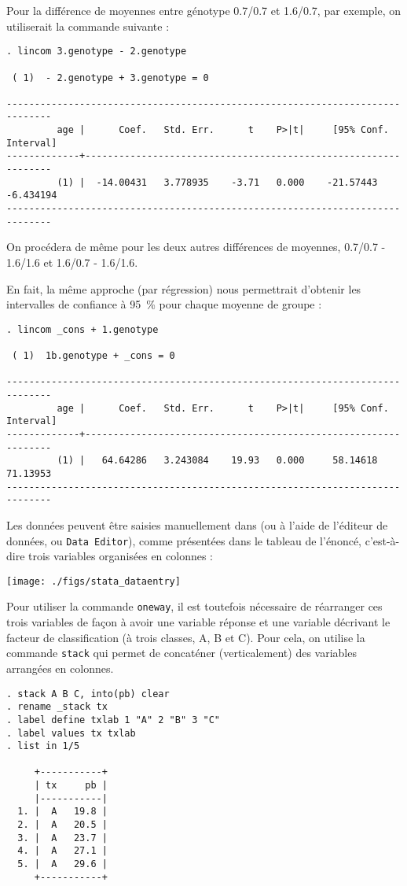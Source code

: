 Pour la différence de moyennes entre génotype 0.7/0.7 et 1.6/0.7, par
exemple, on utiliserait la commande suivante :
\begin{verbatim}
. lincom 3.genotype - 2.genotype

 ( 1)  - 2.genotype + 3.genotype = 0

------------------------------------------------------------------------------
         age |      Coef.   Std. Err.      t    P>|t|     [95% Conf. Interval]
-------------+----------------------------------------------------------------
         (1) |  -14.00431   3.778935    -3.71   0.000    -21.57443   -6.434194
------------------------------------------------------------------------------
\end{verbatim}
On procédera de même pour les deux autres différences de moyennes, 0.7/0.7 -
1.6/1.6 et 1.6/0.7 - 1.6/1.6.

En fait, la même approche (par régression) nous permettrait d'obtenir les
intervalles de confiance à 95~\% pour chaque moyenne de groupe :
\begin{verbatim}
. lincom _cons + 1.genotype

 ( 1)  1b.genotype + _cons = 0

------------------------------------------------------------------------------
         age |      Coef.   Std. Err.      t    P>|t|     [95% Conf. Interval]
-------------+----------------------------------------------------------------
         (1) |   64.64286   3.243084    19.93   0.000     58.14618    71.13953
------------------------------------------------------------------------------
\end{verbatim}

\soln{\ref{exo:9.6}}
Les données peuvent être saisies manuellement dans \Stata (ou à l'aide de
l'éditeur de données, ou \texttt{Data Editor}), comme présentées dans le
tableau de l'énoncé, c'est-à-dire trois variables organisées en colonnes :

\texttt{[image: ./figs/stata\_dataentry]}

Pour utiliser la commande \texttt{oneway}, il est toutefois nécessaire de
réarranger ces trois variables de façon à avoir une variable réponse et une
variable décrivant le facteur de classification (à trois classes, A, B et
C). Pour cela, on utilise la commande \texttt{stack} qui permet de
concaténer (verticalement) des variables arrangées en colonnes.
\begin{verbatim}
. stack A B C, into(pb) clear
. rename _stack tx
. label define txlab 1 "A" 2 "B" 3 "C"
. label values tx txlab
. list in 1/5

     +-----------+
     | tx     pb |
     |-----------|
  1. |  A   19.8 |
  2. |  A   20.5 |
  3. |  A   23.7 |
  4. |  A   27.1 |
  5. |  A   29.6 |
     +-----------+
\end{verbatim}

